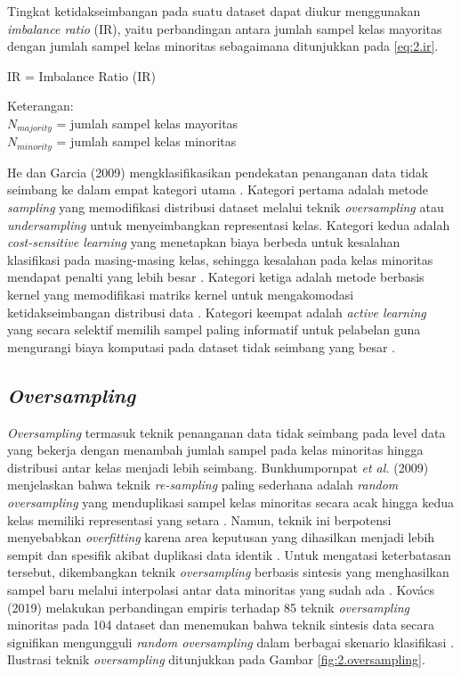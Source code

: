 Tingkat ketidakseimbangan pada suatu dataset dapat diukur menggunakan \textit{imbalance ratio} (IR), yaitu perbandingan antara jumlah sampel kelas mayoritas dengan jumlah sampel kelas minoritas sebagaimana ditunjukkan pada \ref{eq:2.ir}.

\begin{equationcaptioned}[eq:2.ir]{
    IR = 
}{
    Imbalance Ratio (IR)
}
\end{equationcaptioned}

Keterangan: \\
$N_{majority}$ = jumlah sampel kelas mayoritas \\
$N_{minority}$ = jumlah sampel kelas minoritas

He dan Garcia (2009) mengklasifikasikan pendekatan penanganan data tidak seimbang ke dalam empat kategori utama \cite{He2009Imbalanced}. Kategori pertama adalah metode \textit{sampling} yang memodifikasi distribusi dataset melalui teknik \textit{oversampling} atau \textit{undersampling} untuk menyeimbangkan representasi kelas. Kategori kedua adalah \textit{cost-sensitive learning} yang menetapkan biaya berbeda untuk kesalahan klasifikasi pada masing-masing kelas, sehingga kesalahan pada kelas minoritas mendapat penalti yang lebih besar \cite{He2009Imbalanced}. Kategori ketiga adalah metode berbasis kernel yang memodifikasi matriks kernel untuk mengakomodasi ketidakseimbangan distribusi data \cite{He2009Imbalanced}. Kategori keempat adalah \textit{active learning} yang secara selektif memilih sampel paling informatif untuk pelabelan guna mengurangi biaya komputasi pada dataset tidak seimbang yang besar \cite{He2009Imbalanced}.


\subsection{\textit{Oversampling}} \label{II.oversampling}
\textit{Oversampling} termasuk teknik penanganan data tidak seimbang pada level data yang bekerja dengan menambah jumlah sampel pada kelas minoritas hingga distribusi antar kelas menjadi lebih seimbang. Bunkhumpornpat \textit{et al.} (2009) menjelaskan bahwa teknik \textit{re-sampling} paling sederhana adalah \textit{random oversampling} yang menduplikasi sampel kelas minoritas secara acak hingga kedua kelas memiliki representasi yang setara \cite{Bunkhumpornpat2009SafeLevel}. Namun, teknik ini berpotensi menyebabkan \textit{overfitting} karena area keputusan yang dihasilkan menjadi lebih sempit dan spesifik akibat duplikasi data identik \cite{Bunkhumpornpat2009SafeLevel}. Untuk mengatasi keterbatasan tersebut, dikembangkan teknik \textit{oversampling} berbasis sintesis yang menghasilkan sampel baru melalui interpolasi antar data minoritas yang sudah ada \cite{Chawla2002SMOTE}. Kov\'{a}cs (2019) melakukan perbandingan empiris terhadap 85 teknik \textit{oversampling} minoritas pada 104 dataset dan menemukan bahwa teknik sintesis data secara signifikan mengungguli \textit{random oversampling} dalam berbagai skenario klasifikasi \cite{Kovacs2019Empirical, Kovacs2019SmoteVariants}. Ilustrasi teknik \textit{oversampling} ditunjukkan pada Gambar \ref{fig:2.oversampling}.

